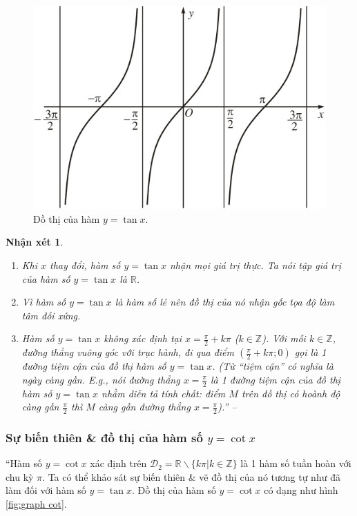 \documentclass[oneside]{book}
\numberwithin{equation}{section}
\newtheorem{nhanxet}{Nhận xét}[section]
\begin{document}
\begin{itemize}
	\begin{figure}[H]
		\centering
		\includegraphics[scale=0.15]{graph_tan}
		\caption{Đồ thị của hàm $y = \tan x$.}
		\label{fig:graph tan}
	\end{figure}

	\begin{nhanxet}
		\begin{enumerate}
			\item Khi $x$ thay đổi, hàm số $y = \tan x$ nhận mọi giá trị thực. Ta nói \emph{tập giá trị} của hàm số $y = \tan x$ là $\mathbb{R}$.
			\item Vì hàm số $y = \tan x$ là hàm số lẻ nên đồ thị của nó nhận gốc tọa độ làm tâm đối xứng.
			\item Hàm số $y = \tan x$ không xác định tại $x = \frac{\pi}{2} + k\pi$ ($k\in\mathbb{Z}$). Với mỗi $k\in\mathbb{Z}$, đường thẳng vuông góc với trục hành, đi qua điểm $\left(\frac{\pi}{2} + k\pi;0\right)$ gọi là 1 \emph{đường tiệm cận} của đồ thị hàm số $y = \tan x$. (Từ ``tiệm cận'' có nghĩa là ngày càng gần. E.g., nói đường thẳng $x = \frac{\pi}{2}$ là 1 đường tiệm cận của đồ thị hàm số $y = \tan x$ nhằm diễn tả tính chất: điểm $M$ trên đồ thị có hoành độ càng gần $\frac{\pi}{2}$ thì $M$ càng gần đường thẳng $x = \frac{\pi}{2}$).'' -- \cite[pp. 11--12]{SGK_Toan_11_dai_so_giai_tich_nang_cao}
		\end{enumerate}
	\end{nhanxet}	   
\end{itemize}

\subsubsection{Sự biến thiên \& đồ thị của hàm số $y = \cot x$}
``Hàm số $y = \cot x$ xác định trên $\mathcal{D}_2 = \mathbb{R}\backslash\{k\pi|k\in\mathbb{Z}\}$ là 1 hàm số tuần hoàn với chu kỳ $\pi$. Ta có thể khảo sát sự biến thiên \& vẽ đồ thị của nó tương tự như đã làm đối với hàm số $y = \tan x$. Đồ thị của hàm số $y = \cot x$ có dạng như hình \ref{fig:graph cot}.
\end{document}
